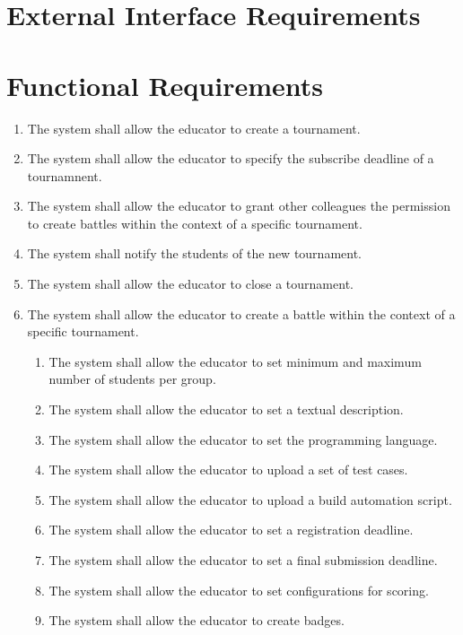 \section{External Interface Requirements}
\section{Functional Requirements}

\begin{enumerate}[label=\textbf{R\arabic*}:,leftmargin=1.3cm]
    \item The system shall allow the educator to create a tournament.
    \item The system shall allow the educator to specify the subscribe deadline of a tournamnent.
    \item The system shall allow the educator to grant other colleagues the permission to create battles within the context of a specific tournament.
    \item The system shall notify the students of the new tournament.
    \item The system shall allow the educator to close a tournament.
    \item The system shall allow the educator to create a battle within the context of a specific tournament.
          \begin{enumerate}[label=\textbf{R\arabic{enumi}.\arabic*}:, leftmargin=*]
              \item The system shall allow the educator to set minimum and maximum number of students per group.
              \item The system shall allow the educator to set a textual description.
              \item The system shall allow the educator to set the programming language.
              \item The system shall allow the educator to upload a set of test cases.
              \item The system shall allow the educator to upload a build automation script.
              \item The system shall allow the educator to set a registration deadline.
              \item The system shall allow the educator to set a final submission deadline.
              \item The system shall allow the educator to set configurations for scoring. %
              \item The system shall allow the educator to create badges. %

\end{enumerate}
\end{enumerate}

